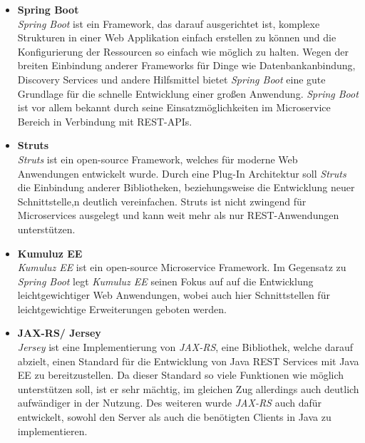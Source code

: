 \begin{itemize}
\item \textbf{Spring Boot}\\
\textit{Spring Boot} ist ein Framework, das darauf ausgerichtet ist, komplexe Strukturen in einer Web Applikation einfach erstellen zu können und die Konfigurierung der Ressourcen so einfach wie möglich zu halten. Wegen der breiten Einbindung anderer Frameworks für Dinge wie Datenbankanbindung, Discovery Services und andere Hilfsmittel bietet \textit{Spring Boot} eine gute Grundlage für die schnelle Entwicklung einer großen Anwendung. \textit{Spring Boot} ist vor allem bekannt durch seine Einsatzmöglichkeiten im Microservice Bereich in Verbindung mit \ac{REST}-\acp{API}\autocite[][]{spring_boot}.

\item \textbf{Struts}\\
\textit{Struts} ist ein open-source Framework, welches für moderne Web Anwendungen entwickelt wurde. Durch eine Plug-In Architektur soll \textit{Struts} die Einbindung anderer Bibliotheken, beziehungsweise die Entwicklung neuer Schnittstelle,n deutlich vereinfachen. Struts ist nicht zwingend für Microservices ausgelegt und kann weit mehr als nur \ac{REST}-Anwendungen unterstützen\autocite[][]{struts}.

\item \textbf{Kumuluz \ac{EE}}\\
\textit{Kumuluz \ac{EE}} ist ein open-source Microservice Framework. Im Gegensatz zu \textit{Spring Boot} legt \textit{Kumuluz \ac{EE}} seinen Fokus auf auf die Entwicklung leichtgewichtiger Web Anwendungen, wobei auch hier Schnittstellen für leichtgewichtige Erweiterungen geboten werden\autocite[][]{kumuluz}.

\item \textbf{\ac{JAX-RS}/ Jersey}\\
\textit{Jersey} ist eine Implementierung von \textit{\ac{JAX-RS}}, eine Bibliothek, welche darauf abzielt, einen Standard für die Entwicklung von Java \ac{REST} Services mit Java \ac{EE} zu bereitzustellen. Da dieser Standard so viele Funktionen wie möglich unterstützen soll, ist er sehr mächtig, im gleichen Zug allerdings auch deutlich aufwändiger in der Nutzung. Des weiteren wurde \textit{\ac{JAX-RS}} auch dafür entwickelt, sowohl den Server als auch die benötigten Clients in Java zu implementieren\autocites[][]{jaxrs}[][]{jersey}.

\end{itemize}


